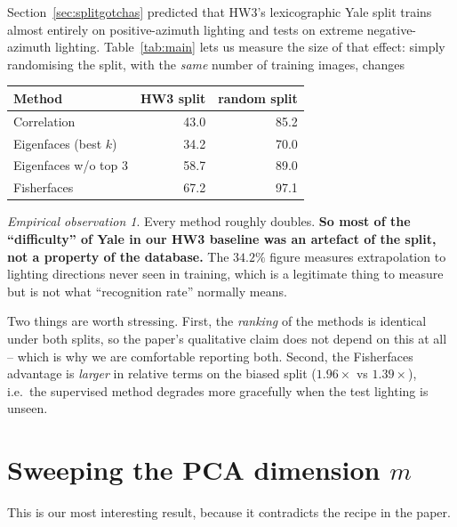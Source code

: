 \documentclass[11pt]{article}
\theoremstyle{definition}
\theoremstyle{remark}
\newtheorem*{observation}{Empirical observation}
\begin{document}
Section~\ref{sec:splitgotchas} predicted that HW3's lexicographic Yale split trains
almost entirely on positive-azimuth lighting and tests on extreme negative-azimuth
lighting. Table~\ref{tab:main} lets us measure the size of that effect: simply
randomising the split, with the \emph{same} number of training images, changes

\begin{center}
\begin{tabular}{lrr}
\toprule
Method & HW3 split & random split \\
\midrule
Correlation            & 43.0 & 85.2 \\
Eigenfaces (best $k$)  & 34.2 & 70.0 \\
Eigenfaces w/o top 3   & 58.7 & 89.0 \\
Fisherfaces            & 67.2 & 97.1 \\
\bottomrule
\end{tabular}
\end{center}

\begin{observation}
Every method roughly doubles. \textbf{So most of the ``difficulty'' of Yale in our
HW3 baseline was an artefact of the split, not a property of the database.} The
$34.2\%$ figure measures extrapolation to lighting directions never seen in
training, which is a legitimate thing to measure but is not what ``recognition
rate'' normally means.

Two things are worth stressing. First, the \emph{ranking} of the methods is
identical under both splits, so the paper's qualitative claim does not depend on
this at all -- which is why we are comfortable reporting both. Second, the
Fisherfaces advantage is \emph{larger} in relative terms on the biased split
($1.96\times$ vs $1.39\times$), i.e.\ the supervised method degrades more
gracefully when the test lighting is unseen.
\end{observation}

\section{Sweeping the PCA dimension \texorpdfstring{$m$}{m}}
\label{sec:msweep}

This is our most interesting result, because it contradicts the recipe in the paper.
\end{document}

